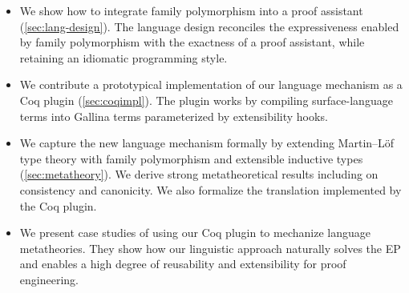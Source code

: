 \begin{itemize}[leftmargin=3.5ex]

\item We show how to integrate family polymorphism into a proof
assistant (\cref{sec:lang-design}).
The language design reconciles the expressiveness enabled by
family polymorphism with the exactness of a proof assistant,
while retaining an idiomatic programming style.

\item We contribute a prototypical implementation of our language
mechanism as a Coq plugin (\cref{sec:coqimpl}). The plugin works by
compiling surface-language terms into Gallina terms parameterized by
extensibility hooks.

\item We capture the new language mechanism formally by extending
Martin–Löf type theory with family polymorphism and extensible inductive
types (\cref{sec:metatheory}).
We derive strong metatheoretical results including on consistency and
canonicity.
We also formalize the translation implemented by the Coq plugin.

\item We present case studies of using our Coq plugin to mechanize
language metatheories.
They show how our linguistic approach naturally solves the EP and
enables a high degree of reusability and extensibility
for proof engineering.

\end{itemize}



